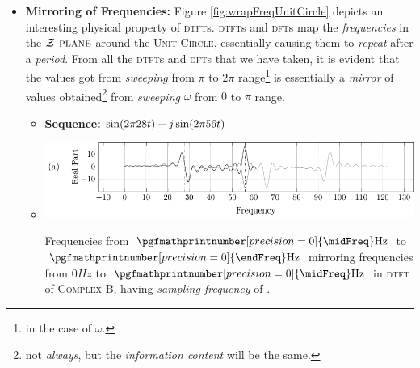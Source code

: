 \documentclass[../../course]{subfiles}
\begin{document}
\begin{itemize} [label=]
\begin{itemize} [label=]
        \end{itemize}

    \item \textbf{Mirroring of Frequencies:} Figure
        \ref{fig:wrapFreqUnitCircle} depicts an interesting physical property
        of \textsc{dtft}s. \textsc{dtft}s and \textsc{dft}s map the
        \emph{frequencies} in the $\mathcal{Z}\textsc{-plane}$ around the
        \textsc{Unit Circle}, essentially causing them to \emph{repeat} after a
        \emph{period}. From all the \textsc{dtft}s and \textsc{dft}s that we
        have taken, it is evident that the values got from \emph{sweeping} from
        $\pi$ to $2 \pi$ range\footnote{in the case of $\omega$.} is
        essentially a \emph{mirror} of values obtained\footnote{not
        \emph{always}, but the \emph{information content} will be the same.}
        from \emph{sweeping} $\omega$ from $0$ to $\pi$ range.

        \def\firstRange{$0 \si{Hz}$ to $\pgfmathprintnumber[precision = 0]{\midFreq}\si{Hz}$ }
        \def\secondRange{%
            $\pgfmathprintnumber[precision = 0]{\midFreq} \si{Hz}$ to %
            $\pgfmathprintnumber[precision = 0]{\endFreq} \si{Hz}$ %
        }

        \begin{itemize} [label=]

            \item \textbf{Sequence:} $\sin(2 \pi 28 t) + j \sin(2 \pi 56 t)$

            \item
                \begin{minipage}[b] {0.85\textwidth}
                    \vspace{6pt}
                    \centering
                     {
                        \includegraphics[height = 0.8\textheight] {tikzpics/plotFreqMirror.pdf}
                    }

                     {
                        Frequencies from \secondRange mirroring frequencies from \firstRange in
                        \textsc{dtft} of \textsc{Complex B}, having \emph{sampling frequency} of
                        \sampFreqSligGreatJust.
                    }
                    \label{plt:freqMirror}


\end{minipage}
\end{itemize}
\end{itemize}
\end{document}
